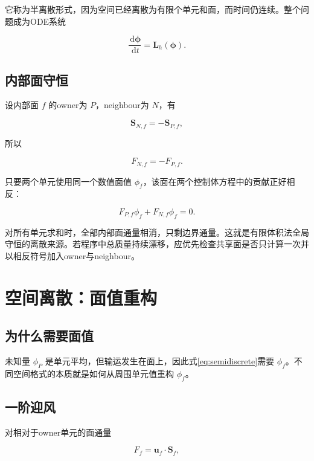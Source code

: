 \documentclass[UTF8,12pt,a4paper,fontset=fandol]{ctexart}
\numberwithin{equation}{section}
\newcommand{\dd}{\,\mathrm d}
\newcommand{\Sf}{\bm S}
\begin{document}
它称为半离散形式，因为空间已经离散为有限个单元和面，而时间仍连续。整个问题成为ODE系统

\begin{equation}
  \frac{\dd\bm\phi}{\dd t}
  =
  \bm L_h(\bm\phi).
\end{equation}

\subsection{内部面守恒}

设内部面 $f$ 的owner为 $P$，neighbour为 $N$，有

\begin{equation}
  \Sf_{N,f}=-\Sf_{P,f},
\end{equation}

所以

\begin{equation}
  F_{N,f}=-F_{P,f}.
\end{equation}

只要两个单元使用同一个数值面值 $\phi_f$，该面在两个控制体方程中的贡献正好相反：

\begin{equation}
  F_{P,f}\phi_f+F_{N,f}\phi_f=0.
\end{equation}

对所有单元求和时，全部内部面通量相消，只剩边界通量。这就是有限体积法全局守恒的离散来源。若程序中总质量持续漂移，应优先检查共享面是否只计算一次并以相反符号加入owner与neighbour。

\section{空间离散：面值重构}

\subsection{为什么需要面值}

未知量 $\phi_P$ 是单元平均，但输运发生在面上，因此式\eqref{eq:semidiscrete}需要 $\phi_f$。不同空间格式的本质就是如何从周围单元值重构 $\phi_f$。

\subsection{一阶迎风}

对相对于owner单元的面通量

\begin{equation}
  F_f=\bm u_f\cdot\Sf_f,
\end{equation}
\end{document}
